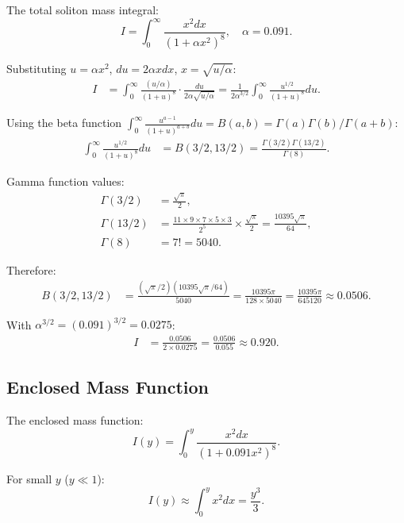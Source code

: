 \documentclass[11pt,a4paper]{article}
\theoremstyle{definition}
\theoremstyle{remark}
\begin{document}
The total soliton mass integral:
\begin{equation}
I = \int_0^\infty \frac{x^2 dx}{(1 + \alpha x^2)^8}, \quad \alpha = 0.091.
\end{equation}

Substituting $u = \alpha x^2$, $du = 2\alpha x dx$, $x = \sqrt{u/\alpha}$:
\begin{align}
I &= \int_0^\infty \frac{(u/\alpha)}{(1+u)^8} \cdot \frac{du}{2\alpha\sqrt{u/\alpha}} = \frac{1}{2\alpha^{3/2}} \int_0^\infty \frac{u^{1/2}}{(1+u)^8} du.
\end{align}

Using the beta function $\int_0^\infty \frac{u^{a-1}}{(1+u)^{a+b}} du = B(a,b) = \Gamma(a)\Gamma(b)/\Gamma(a+b)$:
\begin{align}
\int_0^\infty \frac{u^{1/2}}{(1+u)^8} du &= B(3/2, 13/2) = \frac{\Gamma(3/2)\Gamma(13/2)}{\Gamma(8)}.
\end{align}

Gamma function values:
\begin{align}
\Gamma(3/2) &= \frac{\sqrt{\pi}}{2}, \\
\Gamma(13/2) &= \frac{11 \times 9 \times 7 \times 5 \times 3}{2^5} \times \frac{\sqrt{\pi}}{2} = \frac{10395\sqrt{\pi}}{64}, \\
\Gamma(8) &= 7! = 5040.
\end{align}

Therefore:
\begin{align}
B(3/2, 13/2) &= \frac{(\sqrt{\pi}/2)(10395\sqrt{\pi}/64)}{5040} = \frac{10395 \pi}{128 \times 5040} = \frac{10395\pi}{645120} \approx 0.0506.
\end{align}

With $\alpha^{3/2} = (0.091)^{3/2} = 0.0275$:
\begin{align}
I &= \frac{0.0506}{2 \times 0.0275} = \frac{0.0506}{0.055} \approx 0.920.
\end{align}

\subsection{Enclosed Mass Function}

The enclosed mass function:
\begin{equation}
I(y) = \int_0^y \frac{x^2 dx}{(1 + 0.091 x^2)^8}.
\end{equation}

For small $y$ ($y \ll 1$):
\begin{equation}
I(y) \approx \int_0^y x^2 dx = \frac{y^3}{3}.
\end{equation}
\end{document}
